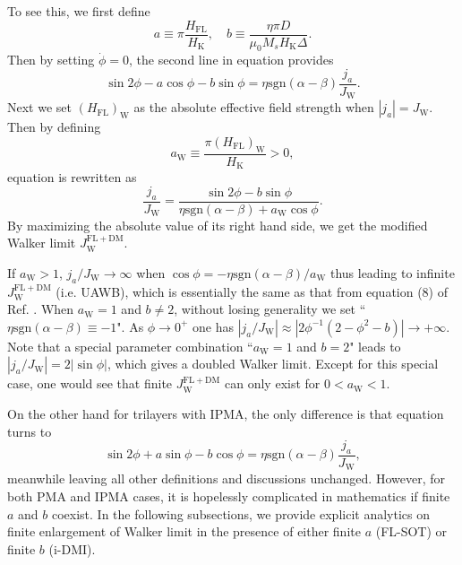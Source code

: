 \documentclass[12pt]{iopart}
\begin{document}
To see this, we first define
\begin{equation}\label{a_b_definition}
 a\equiv \pi\frac{H_{\mathrm{FL}}}{H_{\mathrm{K}}}, \quad b\equiv \frac{\eta\pi D}{\mu_{0} M_s H_{\mathrm{K}} \Delta}.
\end{equation}
Then by setting $\dot{\phi}=0$, the second line in equation  provides
\begin{equation}\label{phi_dot_0_only_FL_SOTs}
\sin 2\phi-a\cos\phi-b\sin\phi=\eta \mathrm{sgn}(\alpha-\beta)\frac{j_a}{J_\mathrm{W}}.
\end{equation}
Next we set $\left(H_{\mathrm{FL}}\right)_{\mathrm{W}}$ as the absolute effective field strength
when $|j_a|=J_{\mathrm{W}}$. Then by defining
\begin{equation}\label{a_W_only_FL_SOTs}
a_{\mathrm{W}}\equiv \frac{\pi \left(H_{\mathrm{FL}}\right)_{\mathrm{W}}}{ H_{\mathrm{K}}}>0,
\end{equation}
equation  is rewritten as
\begin{equation}\label{Je_JW_only_FL_SOTs}
\frac{j_a}{J_{\mathrm{W}}} =\frac{\sin 2\phi-b\sin\phi}{\eta \mathrm{sgn}(\alpha-\beta)+a_{\mathrm{W}}\cos\phi}.
\end{equation}
By maximizing the absolute value of its right hand side, we get the modified Walker limit $J_{\mathrm{W}}^{\mathrm{FL+DM}}$.

If $a_{\mathrm{W}}>1$, $j_a/J_{\mathrm{W}}\rightarrow\infty$
when $\cos\phi=-\eta \mathrm{sgn}(\alpha-\beta)/a_{\mathrm{W}}$ 
thus leading to infinite $J_{\mathrm{W}}^{\mathrm{FL+DM}}$ (i.e. UAWB),
which is essentially the same as that from equation (8) of Ref. \cite{Risinggad_PRB_2017}.
When $a_{\mathrm{W}}=1$ and $b\ne 2$, 
without losing generality we set ``$\eta \mathrm{sgn}(\alpha-\beta)\equiv -1$".
As $\phi\rightarrow 0^+$ one has
$|j_a/J_{\mathrm{W}}|\approx |2\phi^{-1}(2-\phi^2-b)|\rightarrow +\infty$.
Note that a special parameter combination ``$a_{\mathrm{W}}=1$ and $b=2$"
leads to $|j_a/J_{\mathrm{W}}|=2|\sin\phi|$, which gives a doubled Walker limit.
Except for this special case, one would see that finite $J_{\mathrm{W}}^{\mathrm{FL+DM}}$ 
can only exist for $0<a_{\mathrm{W}}<1$.

On the other hand for trilayers with IPMA,
the only difference is that equation  turns to
\begin{equation}\label{phi_dot_0_only_FL_SOTs_IPMA}
\sin 2\phi+a\sin\phi-b\cos\phi=\eta \mathrm{sgn}(\alpha-\beta)\frac{j_a}{J_\mathrm{W}},
\end{equation}
meanwhile leaving all other definitions and discussions unchanged.
However, for both PMA and IPMA cases, it is hopelessly complicated in mathematics if finite $a$ and $b$ coexist.
In the following subsections, we provide explicit analytics on finite enlargement of Walker limit
in the presence of either finite $a$ (FL-SOT) or finite $b$ (i-DMI).
\end{document}
